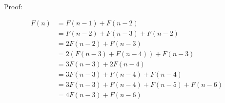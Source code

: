 \documentclass[12pt]{article}
\begin{document}
\bigskip

Proof:

\begin{equation*}
\begin{split}
F(n) & = F(n-1) + F(n-2) \\
& = F(n-2)+F(n-3)+F(n-2) \\
& = 2F(n-2) + F(n-3) \\
& = 2(F(n-3)+F(n-4))+F(n-3) \\
& = 3F(n-3) + 2F(n-4) \\
& = 3F(n-3) + F(n-4) + F(n-4) \\
& = 3F(n-3) + F(n-4) + F(n-5) + F(n-6) \\
& = 4F(n-3) + F(n-6)
\end{split}
\end{equation*}


\bigskip
\end{document}
